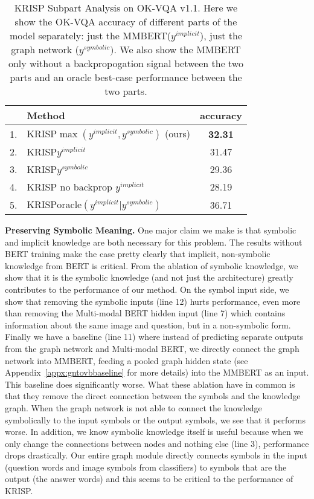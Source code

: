 \documentclass[final]{cvpr}
\providecommand{\ModelName}{KRISP\xspace}
\providecommand{\MMBERTBase}{Multi-modal BERT\xspace}
\providecommand{\MMBERTAbr}{MMBERT\xspace}
\providecommand{\myparagraph}[1]{\noindent\textbf{#1.}}
\providecommand{\sectionvspace}{\vspace{-0cm}}
\begin{document}
\begin{table}[t]
\begin{center}
\begin{tabular}{@{}rlc@{}}
\toprule
&Method &  accuracy\\ 
\hline
1. & \ModelName $\max(y^{implicit},y^{symbolic})$ (ours) & \bf{32.31} \\
2. & \ModelName $y^{implicit}$ & 31.47 \\
3. & \ModelName $y^{symbolic}$ & 29.36 \\
4. & \ModelName no backprop $y^{implicit}$ & 28.19\\
\hline
5. & \ModelName $\text{oracle}(y^{implicit}|y^{symbolic})$  & 36.71\\
\bottomrule
\end{tabular}
\end{center}
\caption{\ModelName Subpart Analysis on OK-VQA v1.1. Here we show the OK-VQA accuracy of different parts of the model separately: just the \MMBERTAbr ($y^{implicit}$), just the graph network ($y^{symbolic})$. We also show the \MMBERTAbr only without a backpropogation signal between the two parts and an oracle best-case performance between the two parts.}
\vspace{-.2cm}
\label{table:GraphAnalysis}
\label{sec:analysis}
\end{table}

\myparagraph{Preserving Symbolic Meaning}
One major claim we make is that symbolic and implicit knowledge are both necessary for this problem. The results without BERT training make the case pretty clearly that implicit, non-symbolic knowledge from BERT is critical. From the ablation of symbolic knowledge, we show that it is the symbolic knowledge (and not just the architecture) greatly contributes to the performance of our method.
On the symbol input side, we show that removing the symbolic inputs (line 12) 
hurts performance, even more than removing the \MMBERTBase hidden input (line 7) which  contains information about the same image and question, but in a non-symbolic form. 
Finally we have a baseline (line 11) where instead of predicting separate outputs from the graph network and \MMBERTBase, we directly connect the graph network into \MMBERTAbr, feeding a pooled graph hidden state (see Appendix~\ref{appx:gntovbbaseline} for more details)
into the \MMBERTAbr 
as an input. This baseline does significantly worse. What these ablation have in common is that they remove the direct connection between the symbols and the knowledge graph. When the graph network is not able to connect the knowledge symbolically to the input symbols or the output symbols, we see that it performs worse. In addition, we know symbolic knowledge itself is useful because when we only change the connections between nodes and nothing else (line 3), performance drops drastically. Our entire graph module directly connects symbols in the input (question words and image symbols from classifiers) to symbols that are the output (the answer words) and this seems to be critical to the performance of \ModelName. 
\sectionvspace
\end{document}
